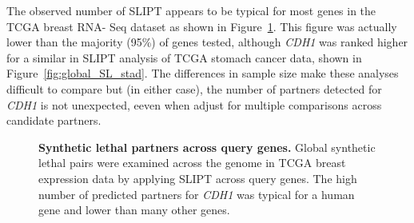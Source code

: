 The observed number of \gls{SLIPT} appears to be typical for most genes in the TCGA breast RNA- Seq dataset as shown in Figure~\ref{fig:global_SL}. This figure was actually lower than the majority (95\%) of genes tested, although \textit{CDH1} was ranked higher for a similar in \gls{SLIPT} analysis of TCGA stomach cancer data, shown in Figure~\ref{fig:global_SL_stad}. The differences in sample size make these analyses difficult to compare but (in either case), the number of partners detected for \textit{CDH1} is not unexpected, eeven when adjust for multiple comparisons across candidate partners.

\begin{figure}[!ht]
\begin{mdframed}
  \begin{center}
   \end{center}
   \caption[Synthetic lethal partners across query genes]{\small \textbf{Synthetic lethal partners across query genes.} Global synthetic lethal pairs were examined across the genome in TCGA breast expression data by applying \gls{SLIPT} across query genes. The high number of predicted partners for \textit{CDH1} was typical for a human gene and lower than many other genes.
   }
\label{fig:global_SL}
\end{mdframed}
\end{figure}

